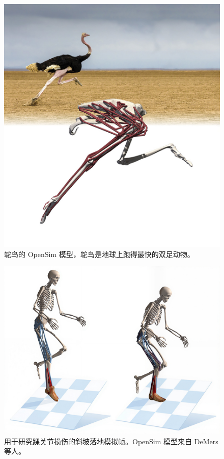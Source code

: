 \begin{figure}[!htb]
	\centering
	\includegraphics[width=0.9\linewidth]{chap13/13_6}
	\caption{鸵鸟的 OpenSim 模型，鸵鸟是地球上跑得最快的双足动物\cite{rankin2016inferring}。 \label{fig:13_6}}
\end{figure}


\begin{figure}[!htb]
	\centering
	\includegraphics[width=1.0\linewidth]{chap13/13_7}
	\caption{用于研究踝关节损伤的斜坡落地模拟帧。OpenSim 模型来自 DeMers 等人\cite{demers2017preparatory}。 \label{fig:13_7}}
\end{figure}


